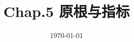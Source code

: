 \documentclass[a4paper]{ctexart}
\date{\today}
\title{Chap.5 原根与指标}
\begin{document}
    \header
    
\end{document}
